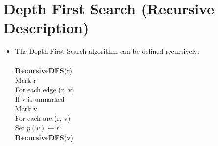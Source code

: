 \documentclass[12pt]{article}
\newcommand{\forceindent}{\leavevmode{\parindent=1em\indent}}
\begin{document}
\section{Depth First Search (Recursive Description)}
\renewcommand{\labelitemii}{$\circ$}
\renewcommand{\labelitemiii}{$\cdot$}
\renewcommand{\labelitemiii}{$\rightarrow$}
\renewcommand{\labelitemiv}{$\star$}
\begin{itemize}
\item The Depth First Search algorithm can be defined recursively:\\
\\
\forceindent \textbf{RecursiveDFS}(r)\\
\forceindent Mark r\\
\forceindent For each edge (r, v)\\
\forceindent \forceindent If v is unmarked\\
\forceindent \forceindent \forceindent Mark v\\
\forceindent \forceindent \forceindent For each arc (r, v)\\
\forceindent \forceindent \forceindent \forceindent Set $p(v) \leftarrow r$\\
\forceindent \forceindent \forceindent \forceindent \textbf{RecursiveDFS}(v)
\end{itemize}
\end{document}
